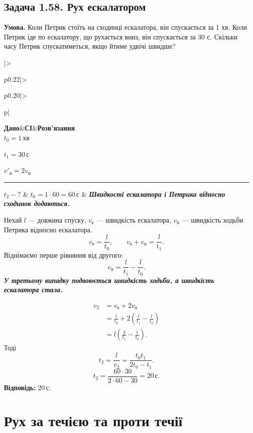 \documentclass[12pt,a4paper]{article}
\newenvironment{solutiontable}{\small\begin{tabular}{|>{\raggedright\arraybackslash}p{0.22\linewidth}|>{\raggedright\arraybackslash}p{0.20\linewidth}|>{\raggedright\arraybackslash}p{\dimexpr0.58\linewidth-6\tabcolsep-4\arrayrulewidth\relax}|}\hline
\textbf{Дано}&\textbf{СІ}&\textbf{Розв'язання}\\\hline}{\\\hline\end{tabular}\par}
\newcommand{\target}[1]{\par\rule{\linewidth}{0.3pt}\par $#1-?$}
\newcommand{\why}[1]{\textbf{\textit{#1}}\par}
\begin{document}
\subsection*{Задача 1.58. Рух ескалатором}
\textbf{Умова.} Коли Петрик стоїть на сходинці ескалатора, він спускається за 1 хв. Коли Петрик іде по ескалатору, що рухається вниз, він спускається за 30 с. Скільки часу Петрик спускатиметься, якщо йтиме удвічі швидше?

\begin{solutiontable}
$t_0=1\,\text{хв}$\par
$t_1=30\,\text{с}$\par
$v'_\text{п}=2v_\text{п}$
\target{t_2}
&
$t_0=1\cdot60=60\,\text{с}$
&
\why{Швидкості ескалатора і Петрика відносно сходинок додаються.}
Нехай $l$ --- довжина спуску, $v_{\text{е}}$ --- швидкість ескалатора, $v_{\text{п}}$ --- швидкість ходьби Петрика відносно ескалатора.
\[v_{\text{е}}=\frac{l}{t_0},\qquad v_{\text{е}}+v_{\text{п}}=\frac{l}{t_1}.\]
Віднімаємо перше рівняння від другого:
\[v_{\text{п}}=\frac{l}{t_1}-\frac{l}{t_0}.\]
\why{У третьому випадку подвоюється швидкість ходьби, а швидкість ескалатора стала.}
\[
\begin{aligned}
v_2&=v_{\text{е}}+2v_{\text{п}}\\
&=\frac{l}{t_0}+2\left(\frac{l}{t_1}-\frac{l}{t_0}\right)\\
&=l\left(\frac{2}{t_1}-\frac{1}{t_0}\right).
\end{aligned}
\]
Тоді
\[t_2=\frac{l}{v_2}=\frac{t_0t_1}{2t_0-t_1}.\]
\[t_2=\frac{60\cdot30}{2\cdot60-30}=20\,\text{с}.\]
\textbf{Відповідь:} $20\,\text{с}$.
\end{solutiontable}
\newpage
\section*{Рух за течією та проти течії}
\begingroup\color{red!80!black}
\end{document}
